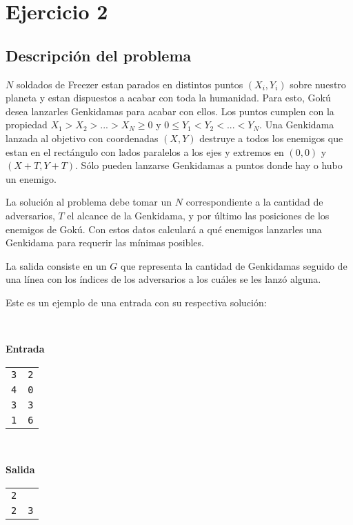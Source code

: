 
\section{Ejercicio 2}
	\subsection{Descripción del problema}

	$N$ soldados de Freezer estan parados en distintos puntos $(X_i,Y_i)$ sobre
	nuestro planeta y estan dispuestos a acabar con toda la humanidad. Para
	esto, Gokú desea lanzarles Genkidamas para acabar con ellos. Los puntos
	cumplen con la propiedad $ X_1 > X_2 >. . . > X_N \geq 0 $ y $ 0 \leq Y_1 <
	Y_2 < . . . < Y_N$. Una Genkidama lanzada al objetivo con coordenadas $(X,Y)$
	destruye a todos los enemigos que estan en el rectángulo con lados paralelos
	a los ejes y extremos en $(0, 0)$ y $(X + T, Y + T )$. Sólo pueden lanzarse
	Genkidamas a puntos donde hay o hubo un enemigo. 

	La solución al problema debe tomar un $N$ correspondiente a la cantidad de adversarios,
	$T$ el alcance de la Genkidama, y por último las posiciones de los enemigos
	de Gokú. Con estos datos calculará a qué enemigos lanzarles una
	Genkidama para requerir las mínimas posibles.

	La salida consiste en un $G$ que representa la cantidad de Genkidamas
	seguido de una línea con los índices de los adversarios a los cuáles se
	les lanzó alguna.

	Este es un ejemplo de una entrada con su respectiva
	solución:

	~

	\textbf{Entrada}

	\begin{tabular}{ll}
		\texttt{3} & \texttt{2} \\
		\texttt{4} & \texttt{0} \\
		\texttt{3} & \texttt{3} \\
		\texttt{1} & \texttt{6} \\
	\end{tabular}

	~

	\textbf{Salida}

	\begin{tabular}{ll}
		\texttt{2} & \\
		\texttt{2} & \texttt{3} \\
	\end{tabular}

